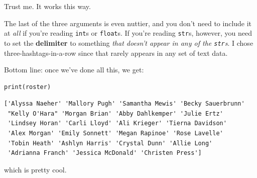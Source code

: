 Trust me. It works this way.

The last of the three arguments is even nuttier, and you don't need to include
it at \textit{all} if you're reading \texttt{int}s or \texttt{float}s. If
you're reading \texttt{str}s, however, you need to set the \textbf{delimiter}
to something \textit{that doesn't appear in any of the \texttt{str}s}. I chose
three-hashtags-in-a-row since that rarely appears in any set of text data.

Bottom line: once we've done all this, we get:

\begin{Verbatim}[fontsize=\small,samepage=true,frame=single,framesep=3mm]
print(roster)
\end{Verbatim}

\begin{Verbatim}[fontsize=\small,samepage=true,frame=leftline,framesep=5mm,framerule=1mm]
['Alyssa Naeher' 'Mallory Pugh' 'Samantha Mewis' 'Becky Sauerbrunn'
 "Kelly O'Hara" 'Morgan Brian' 'Abby Dahlkemper' 'Julie Ertz'
 'Lindsey Horan' 'Carli Lloyd' 'Ali Krieger' 'Tierna Davidson'
 'Alex Morgan' 'Emily Sonnett' 'Megan Rapinoe' 'Rose Lavelle'
 'Tobin Heath' 'Ashlyn Harris' 'Crystal Dunn' 'Allie Long'
 'Adrianna Franch' 'Jessica McDonald' 'Christen Press']
\end{Verbatim}

which is pretty cool.

